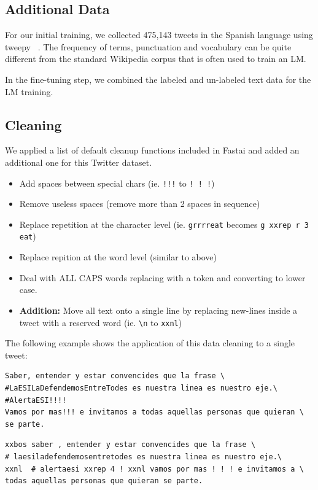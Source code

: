 \documentclass[smallextended]{svjour3}       %
\begin{document}
\subsection{Additional Data}
For our initial training, we  collected 475,143 tweets in the Spanish language using tweepy ~\cite{Tweepy}.  The frequency of terms, punctuation and vocabulary can be quite different from the standard Wikipedia corpus that is often used to train an LM.

In the fine-tuning step, we combined the labeled and un-labeled text data for the LM training.
\subsection{Cleaning}
We applied a list of default cleanup functions included in Fastai\cite{} and added an additional one for this Twitter dataset.
\begin{itemize}
	\item Add spaces between special chars (ie. \verb|!!!| to \verb|! ! !|)
	\item Remove useless spaces (remove more than 2 spaces in sequence)
	\item Replace repetition at the character level (ie. \verb|grrrreat| becomes \verb|g xxrep r 3 eat|)
	\item Replace repition at the word level (similar to above)
	\item Deal with ALL CAPS words replacing with a token and converting to lower case.
	\item \textbf{Addition:} Move all text onto a single line by replacing new-lines inside a tweet with a reserved word (ie. \verb|\n| to \verb|xxnl|)
\end{itemize} 
The following example shows the application of this data cleaning to a single tweet:
\begin{verbatim} 
Saber, entender y estar convencides que la frase \
#LaESILaDefendemosEntreTodes es nuestra linea es nuestro eje.\
#AlertaESI!!!!
Vamos por mas!!! e invitamos a todas aquellas personas que quieran \
se parte.
\end{verbatim}

\begin{verbatim} 
xxbos saber , entender y estar convencides que la frase \
# laesiladefendemosentretodes es nuestra linea es nuestro eje.\
xxnl  # alertaesi xxrep 4 ! xxnl vamos por mas ! ! ! e invitamos a \
todas aquellas personas que quieran se parte.
\end{verbatim}
\end{document}
